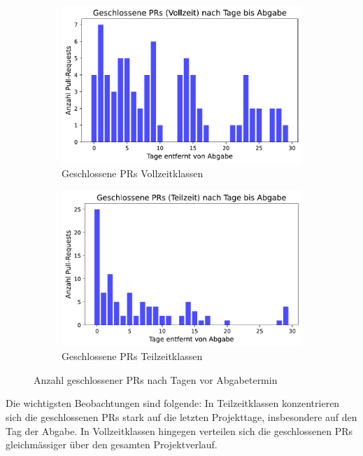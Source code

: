 \begin{figure}[htbp] 
\centering \begin{subfigure}[b]{0.48\textwidth} 
\centering \includegraphics[width=\textwidth]{Figures/closed-prs-projektzeit-vollzeit.pdf} 
\caption{Geschlossene PRs Vollzeitklassen} 
\label{fig:closed-prs-projektkeit-vollzeit}
\end{subfigure} 
\hfill 
\begin{subfigure}[b]{0.48\textwidth} 
\centering \includegraphics[width=\textwidth]{Figures/closed-prs-projektzeit-teilzeit.pdf} 
\caption{Geschlossene PRs Teilzeitklassen} 
\label{fig:closed-prs-projektkeit-teilzeit} 
\end{subfigure} 
\caption{Anzahl geschlossener PRs nach Tagen vor Abgabetermin} 
\label{fig:closed-prs-projektzeit} 
\end{figure}


Die wichtigsten Beobachtungen sind folgende: In Teilzeitklassen konzentrieren sich die geschlossenen PRs stark auf die letzten Projekttage, insbesondere auf den Tag der Abgabe. In Vollzeitklassen hingegen verteilen sich die geschlossenen PRs gleichmässiger über den gesamten Projektverlauf.


